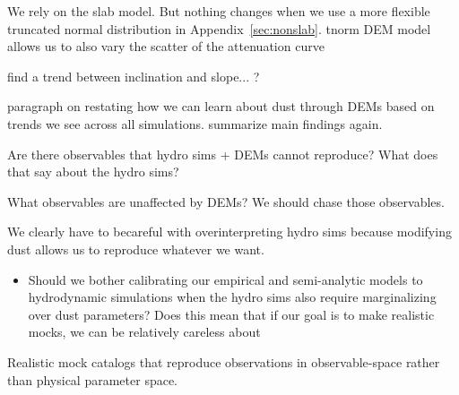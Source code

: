 We rely on the slab model. But nothing changes when we use a more flexible
truncated normal distribution in Appendix~\ref{sec:nonslab}. tnorm DEM model allows us to also vary the
scatter of the attenuation curve 

\cite{chevallard2013}
\cite{trayford2015}
\cite{battisti2017a} find a trend between inclination and slope...
\cite{naranyanan2018}? 


paragraph on restating how we can learn about dust through DEMs based on trends we see
across all simulations. summarize main findings again. 


Are there observables that hydro sims + DEMs cannot reproduce? What does that say about the hydro sims?

What observables are unaffected by DEMs? We should chase those observables. 

We clearly have to becareful with overinterpreting hydro sims because modifying
dust allows us to reproduce whatever we want. 
\begin{itemize}
    \item Should we bother calibrating our empirical and semi-analytic models
        to hydrodynamic simulations when the hydro sims also require
        marginalizing over dust parameters? Does this mean that if our goal is
        to make realistic mocks, we can be relatively careless about 
\end{itemize}


Realistic mock catalogs that reproduce observations in observable-space rather
than physical parameter space.  
